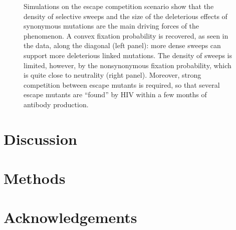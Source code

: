 \documentclass[12pt,a4paper,notitlepage,onecolumn]{article}
\begin{document}
\begin{figure}
\begin{center}

\caption{Simulations on the escape competition scenario show that the density of
 selective sweeps and the size of the deleterious effects of synonymous
 mutations are the main driving forces of the phenomenon. A convex fixation
 probability is recovered, as seen in the data, along the diagonal (left panel):
 more dense sweeps can support more deleterious linked mutations. The density of
 sweeps is limited, however, by the nonsynonymous fixation probability, which is
 quite close to neutrality (right panel). Moreover, strong competition between
 escape mutants is required, so that several escape mutants are ``found'' by HIV
within a few months of antibody production.}

\end{center}
\end{figure}

\section{Discussion}
\section{Methods}
\section*{Acknowledgements}



\end{document}
